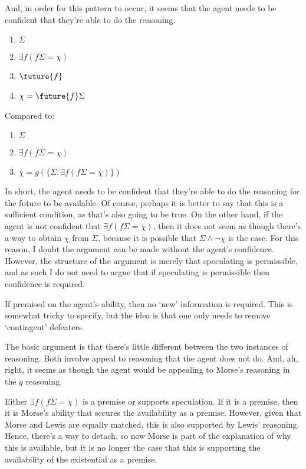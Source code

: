 \documentclass[10pt]{article}
\begin{document}
And, in order for this pattern to occur, it seems that the agent needs to be confident that they're able to do the reasoning.

\begin{enumerate}
\item \(\Sigma\)
\item \(\exists f(f\Sigma = \chi)\)
\item \(\future{f}\)
\item \(\chi = \future{f}\Sigma\)
\end{enumerate}

Compared to:

\begin{enumerate}
\item \(\Sigma\)
\item \(\exists f(f\Sigma = \chi)\)
\item \(\chi = g(\{\Sigma, \exists f(f\Sigma = \chi)\})\)
\end{enumerate}

In short, the agent needs to be confident that they're able to do the reasoning for the future to be available.
Of course, perhaps it is better to say that this is a sufficient condition, as that's also going to be true.
On the other hand, if the agent is not confident that \(\exists f(f\Sigma = \chi)\), then it does not seem as though there's a way to obtain \(\chi\) from \(\Sigma\), because it is possible that \(\Sigma \land \lnot\chi\) is the case.
For this reason, I doubt the argument can be made without the agent's confidence.
However, the structure of the argument is merely that speculating is permissible, and as such I do not need to argue that if speculating is permissible then confidence is required.

If premised on the agent's ability, then no `new' information is required.
This is somewhat tricky to specify, but the idea is that one only needs to remove `contingent' defeaters.

The basic argument is that there's little different between the two instances of reasoning.
Both involve appeal to reasoning that the agent does not do.
And, ah, right, it seems as though the agent would be appealing to Morse's reasoning in the \(g\) reasoning.

Either \(\exists f(f\Sigma = \chi)\) is a premise or supports speculation.
If it is a premise, then it is Morse's ability that secures the availability as a premise.
However, given that Morse and Lewis are equally matched, this is also supported by Lewis' reasoning.
Hence, there's a way to detach, so now Morse is part of the explanation of why this is available, but it is no longer the case that this is supporting the availability of the existential as a premise.
\end{document}
